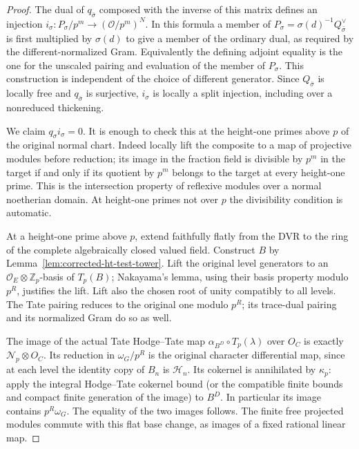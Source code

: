 \begin{proof}
The dual of \(q_{\bar\sigma}\) composed with the inverse of this
matrix defines an injection \(i_\sigma:P_\sigma/p^m\to
(\mathcal O/p^m)^N\). In this formula a member of
\(P_\sigma=\sigma(d)^{-1}Q_{\bar\sigma}^{\vee}\) is first multiplied
by \(\sigma(d)\) to give a member of the ordinary dual, as required
by the different-normalized Gram. Equivalently the defining
adjoint equality is the one for the unscaled pairing and evaluation
of the member of \(P_\sigma\). This construction is independent of
the choice of different generator. Since \(Q_{\bar\sigma}\) is
locally free and \(q_{\bar\sigma}\) is surjective, \(i_\sigma\) is
locally a split injection, including over a nonreduced thickening.

We claim \(q_\sigma i_\sigma=0\). It is enough to check this at
the height-one primes above \(p\) of the original normal chart.
Indeed locally lift the composite to a map of projective modules
before reduction; its image in the fraction field is divisible
by \(p^m\) in the target if and only if its quotient by \(p^m\)
belongs to the target at every height-one prime. This is the
intersection property of reflexive modules over a normal
noetherian domain. At height-one primes not over \(p\) the
divisibility condition is automatic.

At a height-one prime above \(p\), extend faithfully flatly from
the DVR to the ring of the complete algebraically closed valued
field. Construct \(B\) by Lemma~\ref{lem:corrected-ht-test-tower}.
Lift the original level generators to an
\(\mathcal O_E\otimes\mathbb Z_p\)-basis of \(T_p(B)\);
Nakayama's lemma, using their basis property modulo \(p^R\),
justifies the lift. Lift also the chosen root of unity compatibly
to all levels. The Tate pairing reduces to the original one
modulo \(p^R\); its trace-dual pairing and its normalized Gram
do so as well.

The image of the actual Tate Hodge--Tate map
\(\alpha_{B^D}\circ T_p(\lambda)\) over \(O_C\) is exactly
\(\mathcal N_p\otimes O_C\). Its reduction in \(\omega_G/p^R\)
is the original character differential map, since at each level
the identity copy of \(B_n\) is \(\mathcal H_n\).
Its cokernel is annihilated by \(\kappa_p\): apply the integral
Hodge--Tate cokernel bound (or the compatible finite bounds and
compact finite generation of the image) to \(B^D\).
In particular its image contains \(p^R\omega_G\).
The equality of the two images follows.
The finite free projected modules commute with this flat
base change, as images of a fixed rational linear map.


\end{proof}
